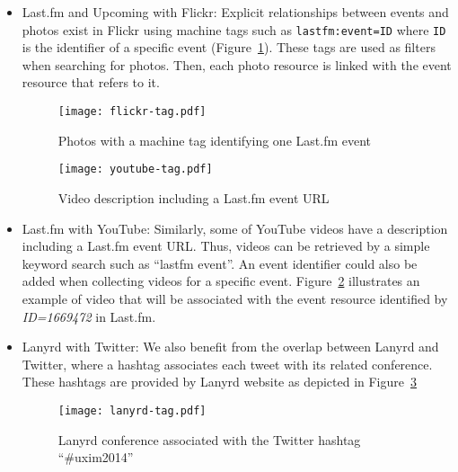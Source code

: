 \begin{itemize}

\item Last.fm and Upcoming with Flickr: Explicit relationships between events and photos exist in Flickr using machine tags such as \texttt{lastfm:event=ID} where \texttt{ID} is the identifier of a specific event (Figure~\ref{fig:flickr-tag}). These tags are used as filters when searching for photos. Then, each photo resource is linked with the event resource that refers to it.

\begin{figure}[htbp]
  \centering
  \texttt{[image: flickr-tag.pdf]}
  \caption{Photos with a machine tag identifying one Last.fm event}
  \label{fig:flickr-tag}
\end{figure}

\begin{figure}[htbp]
  \centering
  \texttt{[image: youtube-tag.pdf]}
  \caption{Video description including a Last.fm event URL}
  \label{fig:youtube-tag}
\end{figure}

\item Last.fm with YouTube: Similarly, some of YouTube videos have a description including a Last.fm event URL. Thus, videos can be retrieved by a simple keyword search such as ``lastfm event''. An event identifier could also be added when collecting videos for a specific event. Figure~\ref{fig:youtube-tag} illustrates an example of video that will be associated with the event resource identified by \emph{ID=1669472} in Last.fm. 

\item Lanyrd with Twitter: We also benefit from the overlap between Lanyrd and Twitter, where a hashtag associates each tweet with its related conference. These hashtags are provided by Lanyrd website as depicted in Figure~\ref{fig:lanyrd-tag}

\begin{figure}[H]
  \centering
  \texttt{[image: lanyrd-tag.pdf]}
  \caption{Lanyrd conference associated with the Twitter hashtag ``{\#}uxim2014''}
  \label{fig:lanyrd-tag}
\end{figure}

\end{itemize}

